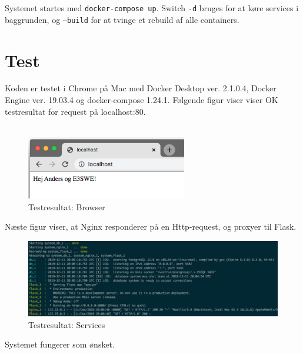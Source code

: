 \documentclass[a4paper]{article}
\begin{document}
\begin{par}
Systemet startes med \texttt{docker-compose up}.
Switch \texttt{-d} bruges for at køre services i baggrunden, og
\texttt{--build} for at tvinge et rebuild af alle containers.
\end{par}

\section{Test}
Koden er testet i Chrome på Mac med Docker Desktop ver. 2.1.0.4, Docker Engine ver. 19.03.4 og docker-compose 1.24.1.
Følgende figur viser viser OK testresultat for request på localhost:80.
\\\\
\begin{figure}[H]
\centering
\includegraphics[width=7cm]{../img/test.png}
\caption{Testresultat: Browser\label{fig:test}}
\end{figure}

\begin{par}
Næste figur viser, at Nginx responderer på en Http-request, og proxyer til Flask.
\end{par}

\begin{figure}[H]
\centering
\includegraphics[width=16cm]{../img/test2.png}
\caption{Testresultat: Services\label{fig:test2}}
\end{figure}

\begin{par}
Systemet fungerer som ønsket.
\end{par}
\end{document}
